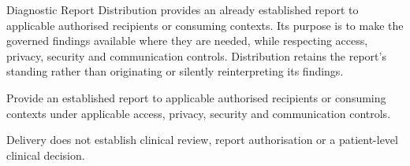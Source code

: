 Diagnostic Report Distribution provides an already established report to applicable authorised recipients or consuming contexts. Its purpose is to make the governed findings available where they are needed, while respecting access, privacy, security and communication controls. Distribution retains the report's standing rather than originating or silently reinterpreting its findings.



Provide an established report to applicable authorised recipients or consuming contexts under applicable access, privacy, security and communication controls.



Delivery does not establish clinical review, report authorisation or a patient-level clinical decision.


